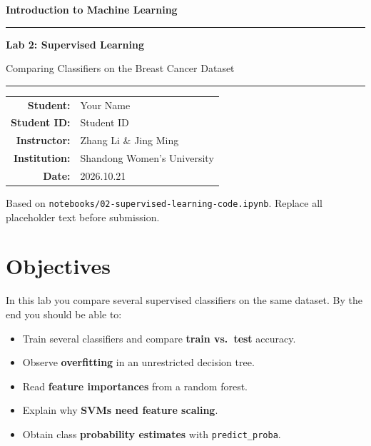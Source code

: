 \documentclass[11pt,a4paper]{article}
\newcommand{\Course}{Introduction to Machine Learning}
\newcommand{\LabNo}{Lab 2}
\newcommand{\LabTitle}{Supervised Learning}
\newcommand{\StudentName}{Your Name}          %
\newcommand{\StudentID}{Student ID}           %
\newcommand{\DueDate}{2026.10.21}                 %
\newcommand{\Instructor}{Zhang Li \& Jing Ming}
\newcommand{\Institution}{Shandong Women's University}
\begin{document}
\begin{titlepage}
\centering
\vspace*{2cm}
{\LARGE\bfseries \Course\par}
\vspace{0.6cm}
{\color{accent}\rule{\linewidth}{1.5pt}}\par
\vspace{0.5cm}
{\Huge\bfseries \LabNo: \LabTitle\par}
\vspace{0.3cm}
{\large Comparing Classifiers on the Breast Cancer Dataset\par}
\vspace{0.4cm}
{\color{accent}\rule{\linewidth}{1.5pt}}\par
\vspace{2.3cm}

\begin{tabular}{rl}
  \textbf{Student:}    & \StudentName \\[4pt]
  \textbf{Student ID:} & \StudentID \\[4pt]
  \textbf{Instructor:} & \Instructor \\[4pt]
  \textbf{Institution:}& \Institution \\[4pt]
  \textbf{Date:}       & \DueDate \\
\end{tabular}

\vfill
{\color{cmt}\small Based on \texttt{notebooks/02-supervised-learning-code.ipynb}.
Replace all placeholder text before submission.}
\end{titlepage}

\tableofcontents
\newpage

\section{Objectives}
In this lab you compare several supervised classifiers on the same dataset.
By the end you should be able to:
\begin{itemize}[leftmargin=*]
  \item Train several classifiers and compare \textbf{train vs.\ test} accuracy.
  \item Observe \textbf{overfitting} in an unrestricted decision tree.
  \item Read \textbf{feature importances} from a random forest.
  \item Explain why \textbf{SVMs need feature scaling}.
  \item Obtain class \textbf{probability estimates} with \lstinline|predict_proba|.
\end{itemize}
\end{document}
